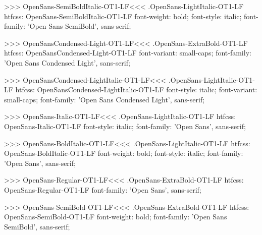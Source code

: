 >>>
\<OpenSans-SemiBoldItalic-OT1-LF\><<<
.OpenSans-LightItalic-OT1-LF
htfcss:  OpenSans-SemiBoldItalic-OT1-LF  font-weight: bold; font-style: italic; font-family: 'Open Sans SemiBold', sans-serif;

>>>
\<OpenSansCondensed-Light-OT1-LF\><<<
.OpenSans-ExtraBold-OT1-LF
htfcss:  OpenSansCondensed-Light-OT1-LF  font-variant: small-caps; font-family: 'Open Sans Condensed Light', sans-serif;

>>>
\<OpenSansCondensed-LightItalic-OT1-LF\><<<
.OpenSans-LightItalic-OT1-LF
htfcss:  OpenSansCondensed-LightItalic-OT1-LF  font-style: italic; font-variant: small-caps; font-family: 'Open Sans Condensed Light', sans-serif;

>>>
\<OpenSans-Italic-OT1-LF\><<<
.OpenSans-LightItalic-OT1-LF
htfcss:  OpenSans-Italic-OT1-LF  font-style: italic; font-family: 'Open Sans', sans-serif;

>>>
\<OpenSans-BoldItalic-OT1-LF\><<<
.OpenSans-LightItalic-OT1-LF
htfcss:  OpenSans-BoldItalic-OT1-LF  font-weight: bold; font-style: italic; font-family: 'Open Sans', sans-serif;

>>>
\<OpenSans-Regular-OT1-LF\><<<
.OpenSans-ExtraBold-OT1-LF
htfcss:  OpenSans-Regular-OT1-LF  font-family: 'Open Sans', sans-serif;

>>>
\<OpenSans-SemiBold-OT1-LF\><<<
.OpenSans-ExtraBold-OT1-LF
htfcss:  OpenSans-SemiBold-OT1-LF  font-weight: bold; font-family: 'Open Sans SemiBold', sans-serif;

